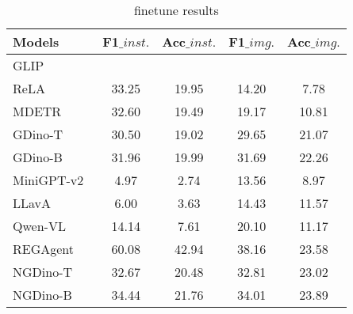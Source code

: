\begin{table}[t]
\caption{finetune results }

\label{tab:exp1}
  \centering

  \begin{tabular}{l c  c c c }
    \toprule
    Models & F1$\_inst.$ & Acc$\_inst.$ & F1$\_img.$ & Acc$\_img.$ \\
    \midrule 
 \rowcolor{black!10}

GLIP~\cite{glip}  &  &  & &  \\
 \rowcolor{black!10}

ReLA~\cite{grefcoco}  & 33.25 & 19.95 & 14.20 & 7.78 \\
MDETR~\cite{mdetr}  & 32.60 & 19.49 & 19.17 & 10.81 \\
GDino-T~\cite{gdino}  & 30.50 & 19.02 & 29.65 & 21.07 \\
GDino-B~\cite{gdino}  & 31.96 & 19.99 & 31.69 & 22.26 \\

\midrule

MiniGPT-v2~\cite{chen2023minigpt}  & 4.97 & 2.74 & 13.56 & 8.97 \\
LLavA~\cite{llava} & 6.00 & 3.63 & 14.43 & 11.57 \\
Qwen-VL~\cite{bai2023qwen} &  14.14 & 7.61 & 20.10 & 11.17 \\
\midrule
REGAgent &  60.08 & 42.94  & 38.16  & 23.58 \\
NGDino-T &  32.67 & 20.48  & 32.81  & 23.02 \\
NGDino-B &  34.44 & 21.76  & 34.01  & 23.89 \\

    
  \bottomrule

\end{tabular}


\end{table}